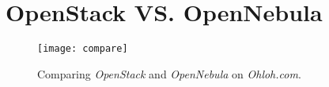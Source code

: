 \chapter{OpenStack VS. OpenNebula} \label{chap:ap2}

\begin{figure}[t]
  \begin{center}
    \leavevmode 
    \texttt{[image: compare]}
    \caption{Comparing \textit{OpenStack} and \textit{OpenNebula} on \textit{Ohloh.com}.\cite{ohloh}}
    \label{fig:ohloh_compare}
  \end{center}
\end{figure}
